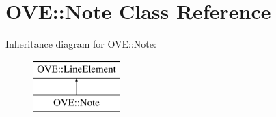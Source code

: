 \hypertarget{class_o_v_e_1_1_note}{}\section{O\+VE\+:\+:Note Class Reference}
\label{class_o_v_e_1_1_note}
Inheritance diagram for O\+VE\+:\+:Note\+:\begin{figure}[H]
\begin{center}
\leavevmode
\includegraphics[height=2.000000cm]{class_o_v_e_1_1_note}
\end{center}
\end{figure}
